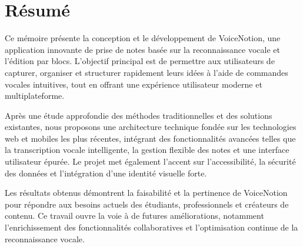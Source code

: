 \chapter*{Résumé}
Ce mémoire présente la conception et le développement de VoiceNotion, une application innovante de prise de notes basée sur la reconnaissance vocale et l’édition par blocs. L’objectif principal est de permettre aux utilisateurs de capturer, organiser et structurer rapidement leurs idées à l’aide de commandes vocales intuitives, tout en offrant une expérience utilisateur moderne et multiplateforme.

Après une étude approfondie des méthodes traditionnelles et des solutions existantes, nous proposons une architecture technique fondée sur les technologies web et mobiles les plus récentes, intégrant des fonctionnalités avancées telles que la transcription vocale intelligente, la gestion flexible des notes et une interface utilisateur épurée. Le projet met également l’accent sur l’accessibilité, la sécurité des données et l’intégration d’une identité visuelle forte.

Les résultats obtenus démontrent la faisabilité et la pertinence de VoiceNotion pour répondre aux besoins actuels des étudiants, professionnels et créateurs de contenu. Ce travail ouvre la voie à de futures améliorations, notamment l’enrichissement des fonctionnalités collaboratives et l’optimisation continue de la reconnaissance vocale.
